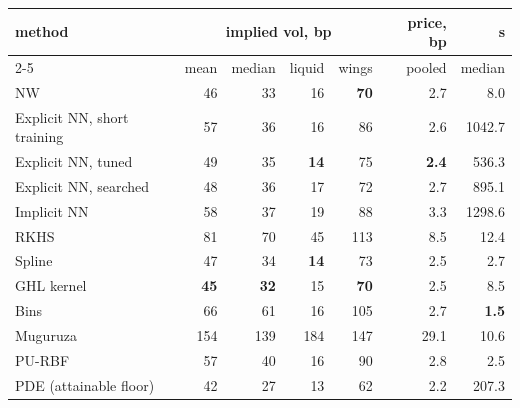 \begin{tabular}{l rrrrr r}
\toprule
method & \multicolumn{4}{c}{implied vol, bp} & price, bp & s\\
\cmidrule(lr){2-5}
& mean & median & liquid & wings & pooled & median\\
\midrule
NW & 46 & 33 & 16 & \textbf{70} & 2.7 & 8.0\\
Explicit NN, short training & 57 & 36 & 16 & 86 & 2.6 & 1042.7\\
Explicit NN, tuned & 49 & 35 & \textbf{14} & 75 & \textbf{2.4} & 536.3\\
Explicit NN, searched & 48 & 36 & 17 & 72 & 2.7 & 895.1\\
Implicit NN & 58 & 37 & 19 & 88 & 3.3 & 1298.6\\
RKHS & 81 & 70 & 45 & 113 & 8.5 & 12.4\\
Spline & 47 & 34 & \textbf{14} & 73 & 2.5 & 2.7\\
GHL kernel & \textbf{45} & \textbf{32} & 15 & \textbf{70} & 2.5 & 8.5\\
Bins & 66 & 61 & 16 & 105 & 2.7 & \textbf{1.5}\\
Muguruza & 154 & 139 & 184 & 147 & 29.1 & 10.6\\
PU-RBF & 57 & 40 & 16 & 90 & 2.8 & 2.5\\
PDE (attainable floor) & 42 & 27 & 13 & 62 & 2.2 & 207.3\\
\bottomrule
\end{tabular}
